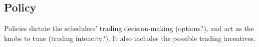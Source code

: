 \subsection{Policy}
Policies dictate the schedulers' trading decision-making (options?), and 
act as the knobs to tune (trading intencity?). It also includes the possible trading incentives.








